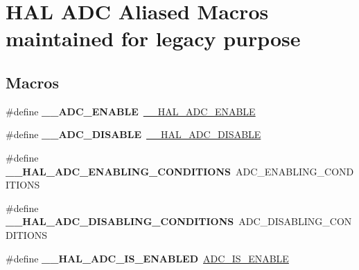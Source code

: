 \hypertarget{group___h_a_l___a_d_c___aliased___macros}{\section{H\-A\-L A\-D\-C Aliased Macros maintained for legacy purpose}
\label{group___h_a_l___a_d_c___aliased___macros}
}
\subsection*{Macros}
\begin{DoxyCompactItemize}
\item 
\hypertarget{group___h_a_l___a_d_c___aliased___macros_gade2e452da8695130dbc0b8b516ec16ff}{\#define {\bfseries \-\_\-\-\_\-\-A\-D\-C\-\_\-\-E\-N\-A\-B\-L\-E}~\hyperlink{group___a_d_c___exported___macros_gaadf16862da7593def189559423c287f4}{\-\_\-\-\_\-\-H\-A\-L\-\_\-\-A\-D\-C\-\_\-\-E\-N\-A\-B\-L\-E}}\label{group___h_a_l___a_d_c___aliased___macros_gade2e452da8695130dbc0b8b516ec16ff}

\item 
\hypertarget{group___h_a_l___a_d_c___aliased___macros_ga6a8dfa9e047c1ac8f70d2fe3ae3fd4dc}{\#define {\bfseries \-\_\-\-\_\-\-A\-D\-C\-\_\-\-D\-I\-S\-A\-B\-L\-E}~\hyperlink{group___a_d_c___exported___macros_ga8afd5963c41c0a30c5cf1fec5c5710b3}{\-\_\-\-\_\-\-H\-A\-L\-\_\-\-A\-D\-C\-\_\-\-D\-I\-S\-A\-B\-L\-E}}\label{group___h_a_l___a_d_c___aliased___macros_ga6a8dfa9e047c1ac8f70d2fe3ae3fd4dc}

\item 
\hypertarget{group___h_a_l___a_d_c___aliased___macros_gaf09405aa65148ec822984b2d81992596}{\#define {\bfseries \-\_\-\-\_\-\-H\-A\-L\-\_\-\-A\-D\-C\-\_\-\-E\-N\-A\-B\-L\-I\-N\-G\-\_\-\-C\-O\-N\-D\-I\-T\-I\-O\-N\-S}~A\-D\-C\-\_\-\-E\-N\-A\-B\-L\-I\-N\-G\-\_\-\-C\-O\-N\-D\-I\-T\-I\-O\-N\-S}\label{group___h_a_l___a_d_c___aliased___macros_gaf09405aa65148ec822984b2d81992596}

\item 
\hypertarget{group___h_a_l___a_d_c___aliased___macros_ga758e02a9d4e37528e42ff60eff476cbf}{\#define {\bfseries \-\_\-\-\_\-\-H\-A\-L\-\_\-\-A\-D\-C\-\_\-\-D\-I\-S\-A\-B\-L\-I\-N\-G\-\_\-\-C\-O\-N\-D\-I\-T\-I\-O\-N\-S}~A\-D\-C\-\_\-\-D\-I\-S\-A\-B\-L\-I\-N\-G\-\_\-\-C\-O\-N\-D\-I\-T\-I\-O\-N\-S}\label{group___h_a_l___a_d_c___aliased___macros_ga758e02a9d4e37528e42ff60eff476cbf}

\item 
\hypertarget{group___h_a_l___a_d_c___aliased___macros_ga2c78554d5c9d8311297ea8fb01866309}{\#define {\bfseries \-\_\-\-\_\-\-H\-A\-L\-\_\-\-A\-D\-C\-\_\-\-I\-S\-\_\-\-E\-N\-A\-B\-L\-E\-D}~\hyperlink{group___a_d_c___private___macros_gafe3a7a04ff078c62ae98b19403f696c7}{A\-D\-C\-\_\-\-I\-S\-\_\-\-E\-N\-A\-B\-L\-E}}\label{group___h_a_l___a_d_c___aliased___macros_ga2c78554d5c9d8311297ea8fb01866309}


\end{DoxyCompactItemize}

